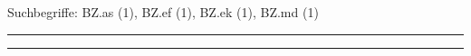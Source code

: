 \documentclass[a4paper,12pt]{report}
\begin{document}

 \scriptsize Suchbegriffe: BZ.as (1), BZ.ef (1), BZ.ek (1), BZ.md (1)\normalsize 
 
%
\hrule	 \leer

%
\hrule	 \leer

\end{document}
